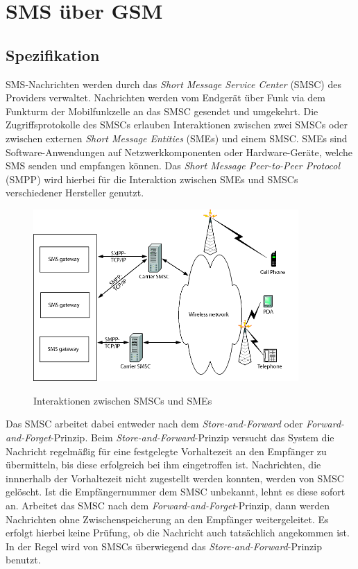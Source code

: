 \documentclass[german,12pt,a4paper]{article}
\begin{document}
\section{SMS über GSM} %
\subsection{Spezifikation}
SMS-Nachrichten werden durch das \textit{Short Message Service Center} (SMSC) des 
Providers verwaltet. Nachrichten werden vom Endgerät über Funk via dem 
Funkturm der Mobilfunkzelle an das SMSC gesendet und umgekehrt. Die 
Zugriffsprotokolle des SMSCs erlauben Interaktionen zwischen zwei SMSCs oder 
zwischen externen \textit{Short Message Entities} (SMEs) und einem SMSC. SMEs sind 
Software-Anwendungen auf Netzwerkkomponenten oder Hardware-Geräte, welche SMS
senden und empfangen können. Das \textit{Short Message Peer-to-Peer Protocol} (SMPP) 
wird hierbei für die Interaktion zwischen SMEs und SMSCs verschiedener 
Hersteller genutzt\cite{thesms}.

\begin{figure}[htm]
    \centering
	\includegraphics[width=0.9\textwidth]{img/smspp.png}
    \label{fig:smspp}
    \caption{Interaktionen zwischen SMSCs und SMEs}
\end{figure}	

Das SMSC arbeitet dabei entweder nach dem \textit{Store-and-Forward} oder 
\textit{Forward-and-Forget}-Prinzip. Beim \textit{Store-and-Forward}-Prinzip versucht das System 
die Nachricht regelmäßig für eine festgelegte Vorhaltezeit an den Empfänger 
zu übermitteln, bis diese erfolgreich bei ihm eingetroffen ist\cite{held:down}. Nachrichten, die innnerhalb 
der Vorhaltezeit nicht zugestellt werden konnten, werden von SMSC gelöscht. 
Ist die Empfängernummer dem SMSC unbekannt, lehnt es diese sofort an.
Arbeitet das SMSC nach dem \textit{Forward-and-Forget}-Prinzip, dann werden Nachrichten ohne 
Zwischenspeicherung an den Empfänger weitergeleitet. Es erfolgt hierbei keine Prüfung, 
ob die Nachricht auch tatsächlich angekommen ist. In der Regel wird von SMSCs überwiegend 
das \textit{Store-and-Forward}-Prinzip benutzt.
\end{document}
